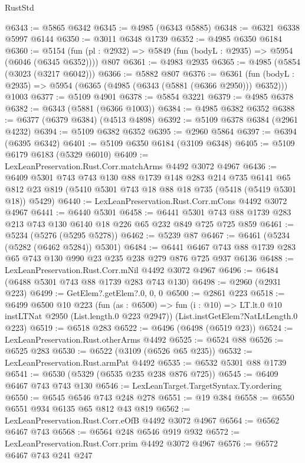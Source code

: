 \begin{lexlean}{RustStd}
\begin{coremodule}
@6343 := @5865 @6342
@6345 := @4985 (@6343 @5885)
@6348 := @6321 @6338 @5997 @6144
@6350 := @3011 @6348 @1739
@6352 := @4985 @6350 @6184
@6360 := @5154 (fun (pl : @2932) => @5849 (fun (bodyL : @2935) => @5954 (@6046 (@6345 @6352)))) @807
@6361 := @4983 @2935
@6365 := @4985 (@5854 (@3023 (@3217 @6042)))
@6366 := @5882 @807
@6376 := @6361
    (fun (bodyL : @2935) => @5954 (@6365 (@4985 (@6343 (@5881 (@6366 @2950))) @6352)))
    @1003
@6377 := @5109 @4901
@6378 := @5854 @3221
@6379 := @4985 @6378
@6382 := @6343 (@5881 (@6366 @1003))
@6384 := @4985 @6382 @6352
@6388 := @6377 (@6379 @6384) (@4513 @4898)
@6392 := @5109 @6378 @6384 (@2961 @4232)
@6394 := @5109 @6382 @6352
@6395 := @2960 @5864
@6397 := @6394 (@6395 @6342)
@6401 := @5109 @6350 @6184 (@3109 @6348)
@6405 := @5109 @6179 @6183 (@5329 @6010)
@6409 := LexLeanPreservation.Rust.Corr.matchArms @4492 @3072 @4967
@6436 := @6409
    @5301
    @743
    @743
    @130
    @88
    @1739
    @148
    @283
    @214
    @735
    @6141
    @65
    @812
    @23
    @819
    (@5410 @5301 @743 @18 @88 @18 @735 (@5418 (@5419 @5301 @18)) @5429)
@6440 := LexLeanPreservation.Rust.Corr.mCons @4492 @3072 @4967
@6441 := @6440 @5301
@6458 := @6441 @5301 @743 @88 @1739 @283 @213 @743 @130 @6140 @18 @226 @65 @232 @849 @725 @725 @859
@6461 := @5234 (@5276 (@5295 @5278))
@6462 := @5239 @87
@6467 := @6461 (@5234 (@5282 (@6462 @5284)) @5301)
@6484 := @6441 @6467 @743 @88 @1739 @283 @65 @743 @130 @990 @23 @235 @238 @279 @876 @725 @937 @6136
@6488 := LexLeanPreservation.Rust.Corr.mNil @4492 @3072 @4967
@6496 := @6484 (@6488 @5301 @743 @88 @1739 @283 @743 @130)
@6498 := @2960 (@2931 @223)
@6499 := GetElem?.getElem?.{0, 0, 0}
@6500 := @2861 @223
@6518 := @6499
    @6500
    @10
    @223
    (fun (as : @6500) =>
    fun (i : @10) => LT.lt.{0} @10 instLTNat @2950 (List.length.{0} @223 @2947))
    (List.instGetElem?NatLtLength.{0} @223)
@6519 := @6518 @283
@6522 := @6496 (@6498 (@6519 @23))
@6524 := LexLeanPreservation.Rust.otherArms @4492
@6525 := @6524 @88
@6526 := @6525 @283
@6530 := @6522 (@3109 (@6526 @65 @235))
@6532 := LexLeanPreservation.Rust.armPat @4492
@6535 := @6532 @5301 @88 @1739
@6541 := @6530 (@5329 (@6535 @235 @238 @876 @725))
@6545 := @6409 @6467 @743 @743 @130
@6546 := LexLeanTarget.TargetSyntax.Ty.ordering
@6550 := @6545 @6546 @743 @248 @278
@6551 := @19 @384
@6558 := @6550 @6551 @934 @6135 @65 @812 @43 @819
@6562 := LexLeanPreservation.Rust.Corr.eOfB @4492 @3072 @4967
@6564 := @6562 @6467 @743
@6568 := @6564 @248 @6546 @919 @932
@6572 := LexLeanPreservation.Rust.Corr.prim @4492 @3072 @4967
@6576 := @6572 @6467 @743 @241 @247

\end{coremodule}
\end{lexlean}
